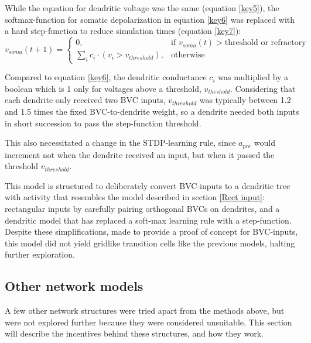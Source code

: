 \documentclass{article}
\begin{document}
    While the equation for dendritic voltage was the same (equation \ref{key5}), the softmax-function for somatic depolarization in equation \ref{key6} was replaced with a hard step-function to reduce simulation times (equation \ref{key7}):
    \begin{equation}\label{key7} v_{soma}(t + 1) = \begin{cases} 0, & \text{if } v_{soma}(t) > \text{threshold or refractory}\\
        \sum_{i}^{} c_i \cdot (v_i > v_{threshold}), & \text{otherwise} \end{cases}\end{equation} 
    
    Compared to equation \ref{key6}, the dendritic conductance \(c_i\) was multiplied by a boolean which is 1 only for voltages above a threshold, \(v_{theshold}\). Considering that each dendrite only received two BVC inputs, \(v_{threshold}\) was typically between 1.2 and 1.5 times the fixed BVC-to-dendrite weight, so a dendrite needed both inputs in short succession to pass the step-function threshold.

    This also necessitated a change in the STDP-learning rule, since \(a_{pre}\) would increment not when the dendrite received an input, but when it passed the threshold \(v_{threshold}\).

    This model is structured to deliberately convert BVC-inputs to a dendritic tree with activity that resembles the model described in section \ref{Rect input}: rectangular inputs by carefully pairing orthogonal BVCs on dendrites, and a dendritic model that has replaced a soft-max learning rule with a step-function. Despite these simplifications, made to provide a proof of concept for BVC-inputs, this model did not yield gridlike transition cells like the previous models, halting further exploration.

    \subsection{Other network models} \label{Other Models}

    A few other network structures were tried apart from the methods above, but were not explored further because they were considered unsuitable. This section will describe the incentives behind these structures, and how they work.
\end{document}
